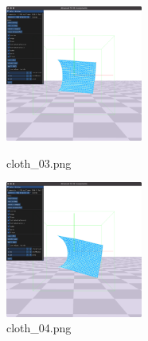 \documentclass[a4paper,10pt,uplatex,dvipdfmx]{jsarticle}
\begin{document}
\begin{figure}[H]
  \begin{minipage}{0.33\hsize}
    \begin{center}
      \includegraphics[width=45mm]{img/cloth_03.png}
      \caption{cloth\_03.png}
    \end{center}
  \end{minipage}
  \begin{minipage}{0.33\hsize}
    \begin{center}
      \includegraphics[width=45mm]{img/cloth_04.png}
      \caption{cloth\_04.png}
    \end{center}
  \end{minipage}
\end{figure}
\end{document}

